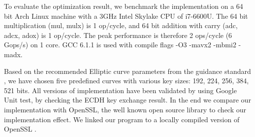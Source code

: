 To evaluate the optimization result, we benchmark the implementation on a 64 bit Arch Linux machine with a 3GHz Intel Skylake CPU of i7-6600U. The 64 bit multiplication (mul, mulx) is 1 op/cycle, and 64 bit addition with carry (adc, adcx, adox) is 1 op/cycle. The peak performance is therefore 2 ops/cycle (6 Gops/s) on 1 core. GCC 6.1.1 is used with compile flags -O3 -mavx2 -mbmi2 -madx. 

Based on the recommended Elliptic curve parameters from the guidance standard \cite{Brown:2010}, we have chosen five predefined curves with various key sizes: 192, 224, 256, 384, 521 bits. All versions of implementation have been validated by using Google Unit test, by checking the ECDH key exchange result. In the end we compare our implementation with OpenSSL, the well known open source library to check our implementation effect. We linked our program to a locally compiled version of OpenSSL . 

